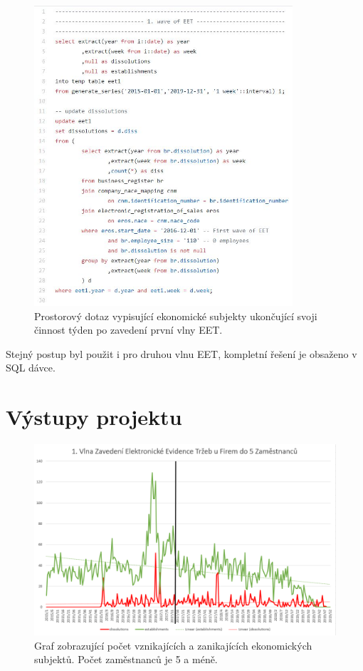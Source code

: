 \documentclass[a4paper, 12pt]{article}
\begin{document}
\newpage
\begin{figure}[h!]
	\centering
	\includegraphics[width=9.6cm]{EET1_A.jpg}
	\caption{Prostorový dotaz vypisující ekonomické subjekty ukončující svoji činnost týden po zavedení první vlny EET.}
\end{figure}

Stejný postup byl použit i pro druhou vlnu EET, kompletní řešení je obsaženo v SQL dávce. 

\newpage
\section{Výstupy projektu}
\begin{figure}[ht]
	\centering
	\includegraphics[width=12cm]{1st_do5.png}
	\caption{Graf zobrazující počet vznikajících a zanikajících ekonomických subjektů. Počet zaměstnanců je 5 a méně.}
\end{figure}
\end{document}

